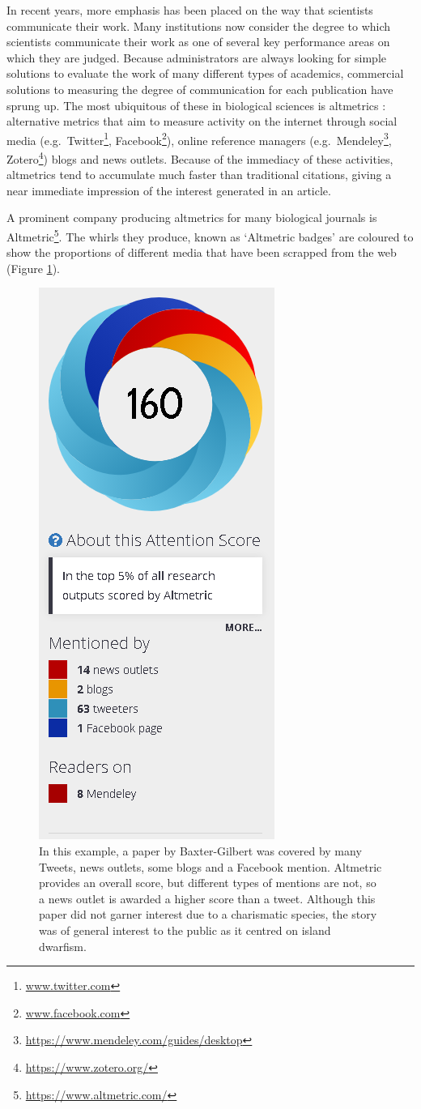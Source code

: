\documentclass[
]{krantz}
\renewcommand{\href}[2]{#2\footnote{\url{#1}}}
\begin{document}
In recent years, more emphasis has been placed on the way that scientists communicate their work. Many institutions now consider the degree to which scientists communicate their work as one of several key performance areas on which they are judged. Because administrators are always looking for simple solutions to evaluate the work of many different types of academics, commercial solutions to measuring the degree of communication for each publication have sprung up. The most ubiquitous of these in biological sciences is altmetrics \citep{priem2012altmetrics}: alternative metrics that aim to measure activity on the internet through social media (e.g.~\href{www.twitter.com}{Twitter}, \href{www.facebook.com}{Facebook}), online reference managers (e.g.~\href{https://www.mendeley.com/guides/desktop}{Mendeley}, \href{https://www.zotero.org/}{Zotero}) blogs and news outlets. Because of the immediacy of these activities, altmetrics tend to accumulate much faster than traditional citations, giving a near immediate impression of the interest generated in an article.

A prominent company producing altmetrics for many biological journals is \href{https://www.altmetric.com/}{Altmetric}. The whirls they produce, known as `Altmetric badges' are coloured to show the proportions of different media that have been scrapped from the web (Figure \ref{fig:atlmetric}).



\begin{figure}
\includegraphics[width=0.4\linewidth]{figures/altmetric} \caption{In this example, a paper by Baxter-Gilbert \citeyearpar{baxter-gilbert2020shrinking} was covered by many Tweets, news outlets, some blogs and a Facebook mention. Altmetric provides an overall score, but different types of mentions are not, so a news outlet is awarded a higher score than a tweet. Although this paper did not garner interest due to a charismatic species, the story was of general interest to the public as it centred on island dwarfism.}\label{fig:atlmetric}
\end{figure}
\end{document}
